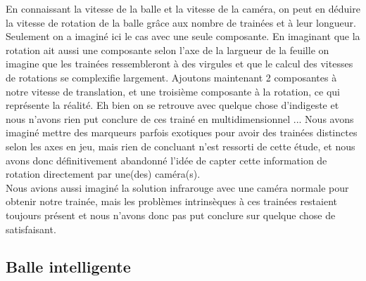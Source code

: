 En connaissant la vitesse de la balle et la vitesse de la caméra, on peut en déduire la vitesse de rotation de la balle grâce aux nombre de trainées et à leur longueur. Seulement on a imaginé ici le cas avec une seule composante. En imaginant que la rotation ait aussi une composante selon l'axe de la largueur de la feuille on imagine que les trainées ressembleront à des virgules et que le calcul des vitesses de rotations se complexifie largement. Ajoutons maintenant 2 composantes à notre vitesse de translation, et une troisième composante à la rotation, ce qui représente la réalité. Eh bien on se retrouve avec quelque chose d'indigeste et nous n'avons rien put conclure de ces trainé en multidimensionnel ... Nous avons imaginé mettre des marqueurs parfois exotiques pour avoir des trainées distinctes selon les axes en jeu, mais rien de concluant n'est ressorti de cette étude, et nous avons donc définitivement abandonné l'idée de capter cette information de rotation directement par une(des) caméra(s).\\

Nous avions aussi imaginé la solution infrarouge avec une caméra normale pour obtenir notre trainée, mais les problèmes intrinsèques à ces trainées restaient toujours présent et nous n'avons donc pas put conclure sur quelque chose de satisfaisant.\\


\subsection{Balle intelligente}

